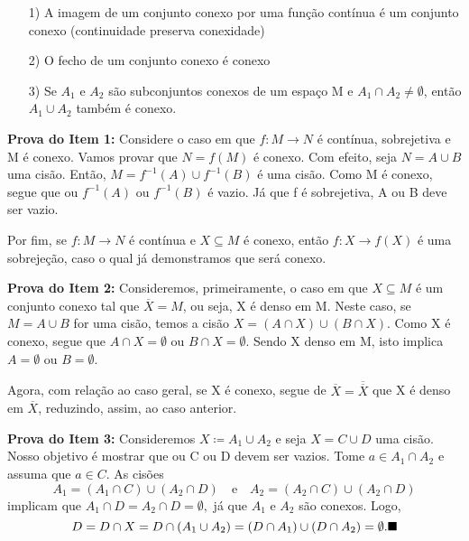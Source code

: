 \documentclass[MetricSpaces/metric_notes.tex]{subfiles}
\begin{document}
\begin{prop*}
	\begin{itemize}
		\item[1)] A imagem de um conjunto conexo por uma função contínua é um conjunto conexo (continuidade preserva conexidade)
		\item[2)] O fecho de um conjunto conexo é conexo
		\item[3)] Se \(A_{1}\) e \(A_{2}\) são subconjuntos conexos de um espaço M e
		      \(A_{1}\cap A_{2}\neq\emptyset\), então \(A_{1}\cup A_{2}\) também é conexo.
	\end{itemize}
\end{prop*}
\begin{proof*}
	\textbf{Prova do Item 1:} Considere o caso em que \(f:M\rightarrow N\) é contínua, sobrejetiva e M é conexo.
	Vamos provar que \(N = f(M)\) é conexo. Com efeito, seja \(N=A\cup{B}\) uma cisão.
	Então, \(M = f^{-1}(A)\cup f^{-1}(B)\) é uma cisão. Como M é conexo, segue que ou \(f^{-1}(A)\) ou \(f^{-1}(B)\) é vazio.
	Já que f é sobrejetiva, A ou B deve ser vazio.

	Por fim, se \(f:M\rightarrow N\) é contínua e \(X\subseteq{M}\) é conexo, então
	\(f:X\rightarrow f(X)\) é uma sobrejeção, caso o qual já demonstramos que será conexo.

	\textbf{Prova do Item 2:} Consideremos, primeiramente, o caso em que \(X\subseteq{M}\) é um conjunto conexo tal que
	\(\overline{X} = M\), ou seja, X é denso em M. Neste caso, se \(M = A\cup B\) for uma cisão, temos a cisão
	\(X = (A\cap X)\cup(B\cap X)\). Como X é conexo, segue que \(A\cap X = \emptyset\) ou \(B\cap X = \emptyset\). Sendo X denso
	em M, isto implica \(A = \emptyset\) ou \(B = \emptyset\).

	Agora, com relação ao caso geral, se X é conexo, segue de \(\overline{X} = \overline{\overline{X}}\) que X é denso em \(\overline{X}\), reduzindo, assim,
	ao caso anterior.

	\textbf{Prova do Item 3:} Consideremos \(X\coloneqq A_{1}\cup A_{2}\) e seja \(X = C\cup D\) uma cisão. Nosso objetivo é mostrar que
	ou C ou D devem ser vazios. Tome \(a\in A_{1}\cap A_{2}\) e assuma que \(a\in C\). As cisões
	\[
		A_{1} = (A_{1}\cap C)\cup (A_{2}\cap D)\quad\text{e}\quad A_{2} = (A_{2}\cap C)\cup(A_{2}\cap D)
	\]
	implicam que \(A_{1}\cap D = A_{2}\cap D = \emptyset, \) já que \(A_{1}\) e \(A_{2}\) são conexos. Logo,
	\[
		D = D\cap X = D\cap(A_{1}\cup A_{2}) = (D\cap A_{1})\cup(D\cap A_{2}) = \emptyset.\text{$\blacksquare$}
	\]
\end{proof*}
\end{document}
